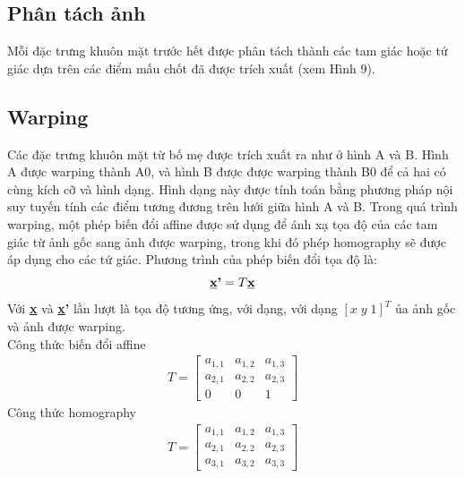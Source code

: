 \documentclass[journal]{IEEEtran}
\begin{document}
\subsection{Phân tách ảnh}
Mỗi đặc trưng khuôn mặt trước hết được phân tách thành các tam giác hoặc tứ giác dựa trên các điểm mấu chốt đã được trích xuất (xem Hình 9).
\subsection{Warping}
Các đặc trưng khuôn mặt từ bố mẹ được trích xuất ra như ở hình A và B. Hình A được warping thành A0, và hình B được được warping thành B0 để cả hai có cùng kích cỡ và hình dạng. Hình dạng này được tính toán bằng phương pháp nội suy tuyến tính các điểm tương đương trên lưới giữa hình A và B. Trong quá trình warping, một phép biến đổi affine được sử dụng để ánh xạ tọa độ của các tam giác từ ảnh gốc sang ảnh được warping, trong khi đó phép homography sẽ được áp dụng cho các tứ giác. Phương trình của phép biến đổi tọa độ là:\[\textbf{\underline{x}'} = T\textbf{\underline{x}}\] 
Với \textbf{\underline{x}} và \textbf{\underline{x}'} lần lượt là tọa độ tương ứng, với dạng, với dạng $[x\; y\; 1]^T$  ủa ảnh gốc và ảnh được warping.
\\
Công thức biến đổi affine
\begin{align*}
	T =
    \begin{bmatrix}
        a_{1,1} & a_{1,2} & a_{1,3} \\
        a_{2,1} & a_{2,2} & a_{2,3} \\
        0 & 0 & 1
    \end{bmatrix}
\end{align*}
Công thức homography
\begin{align*}
	T =
    \begin{bmatrix}
        a_{1,1} & a_{1,2} & a_{1,3} \\
        a_{2,1} & a_{2,2} & a_{2,3} \\
        a_{3,1} & a_{3,2} & a_{3,3}
    \end{bmatrix}
\end{align*}
\end{document}
